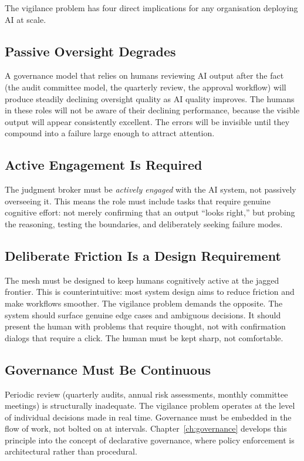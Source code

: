 The vigilance problem has four direct implications for any organisation deploying AI at scale.

\subsection{Passive Oversight Degrades}

A governance model that relies on humans reviewing AI output after the fact (the audit committee model, the quarterly review, the approval workflow) will produce steadily declining oversight quality as AI quality improves. The humans in these roles will not be aware of their declining performance, because the visible output will appear consistently excellent. The errors will be invisible until they compound into a failure large enough to attract attention.

\subsection{Active Engagement Is Required}

The judgment broker must be \emph{actively engaged} with the AI system, not passively overseeing it. This means the role must include tasks that require genuine cognitive effort: not merely confirming that an output ``looks right,'' but probing the reasoning, testing the boundaries, and deliberately seeking failure modes.

\subsection{Deliberate Friction Is a Design Requirement}

The mesh must be designed to keep humans cognitively active at the jagged frontier. This is counterintuitive: most system design aims to reduce friction and make workflows smoother. The vigilance problem demands the opposite. The system should surface genuine edge cases and ambiguous decisions. It should present the human with problems that require thought, not with confirmation dialogs that require a click. The human must be kept sharp, not comfortable.

\subsection{Governance Must Be Continuous}

Periodic review (quarterly audits, annual risk assessments, monthly committee meetings) is structurally inadequate. The vigilance problem operates at the level of individual decisions made in real time. Governance must be embedded in the flow of work, not bolted on at intervals. Chapter~\ref{ch:governance} develops this principle into the concept of declarative governance, where policy enforcement is architectural rather than procedural.

